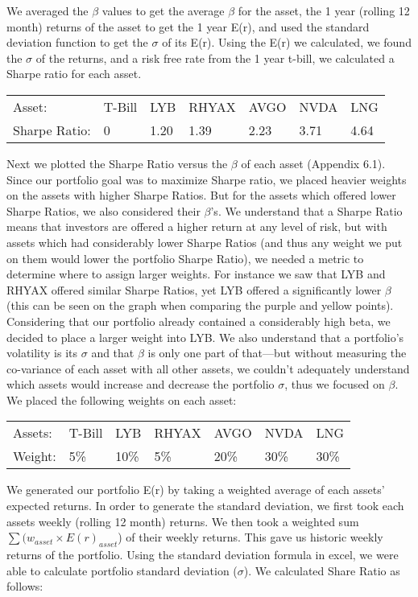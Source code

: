 \documentclass{article}
\begin{document}
We averaged the $\beta$ values to get the average $\beta$ for the asset, the 1 year (rolling 12 month) returns of the asset to get the 1 year E(r), and used the standard deviation function to get the $\sigma$ of its E(r). Using the E(r) we calculated, we found the $\sigma$ of the returns, and a risk free rate from the 1 year t-bill, we calculated a Sharpe ratio for each asset.

\begin{table}[H]
\centering
\begin{tabular}{lllllll}
Asset:        & T-Bill & LYB  & RHYAX & AVGO & NVDA & LNG  \\
Sharpe Ratio: & 0      & 1.20 & 1.39  & 2.23 & 3.71 & 4.64
\end{tabular}
\end{table}

Next we plotted the Sharpe Ratio versus the $\beta$ of each asset (Appendix 6.1). Since our portfolio goal was to maximize Sharpe ratio, we placed heavier weights on the assets with higher Sharpe Ratios. But for the assets which offered lower Sharpe Ratios, we also considered their $\beta$'s. We understand that a Sharpe Ratio means that investors are offered a higher return at any level of risk, but with assets which had considerably lower Sharpe Ratios (and thus any weight we put on them would lower the portfolio Sharpe Ratio), we needed a metric to determine where to assign larger weights. For instance we saw that LYB and RHYAX offered similar Sharpe Ratios, yet LYB offered a significantly lower $\beta$(this can be seen on the graph when comparing the purple and yellow points). Considering that our portfolio already contained a considerably high beta, we decided to place a larger weight into LYB. We also understand that a portfolio's volatility is its $\sigma$ and that $\beta$ is only one part of that—but without measuring the co-variance of each asset with all other assets, we couldn't adequately understand which assets would increase and decrease the portfolio $\sigma$, thus we focused on $\beta$. We placed the following weights on each asset:

\begin{table}[H]
\centering
\begin{tabular}{lllllll}
Assets: & T-Bill & LYB & RHYAX & AVGO & NVDA & LNG  \\
Weight: & 5\%   & 10\% & 5\%   & 20\% & 30\% & 30\%
\end{tabular}
\end{table}

We generated our portfolio E(r) by taking a weighted average of each assets' expected returns. In order to generate the standard deviation, we first took each assets weekly (rolling 12 month) returns. We then took a weighted sum $\sum (w_{asset} \times E(r)_{asset}$) of their weekly returns. This gave us historic weekly returns of the portfolio. Using the standard deviation formula in excel, we were able to calculate portfolio standard deviation ($\sigma$). We calculated Share Ratio as follows:
\end{document}
